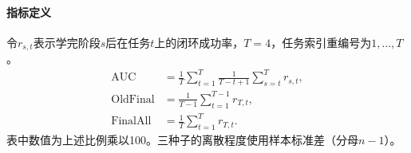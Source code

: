 \paragraph{指标定义}
令$r_{s,t}$表示学完阶段$s$后在任务$t$上的闭环成功率，$T=4$，任务索引重编号为$1,\ldots,T$。
\begin{align}
\mathrm{AUC}&=\frac{1}{T}\sum_{t=1}^{T}\frac{1}{T-t+1}\sum_{s=t}^{T}r_{s,t},\\
\mathrm{OldFinal}&=\frac{1}{T-1}\sum_{t=1}^{T-1}r_{T,t},\\
\mathrm{FinalAll}&=\frac{1}{T}\sum_{t=1}^{T}r_{T,t}.
\end{align}
表中数值为上述比例乘以100。三种子的离散程度使用样本标准差（分母$n-1$）。

